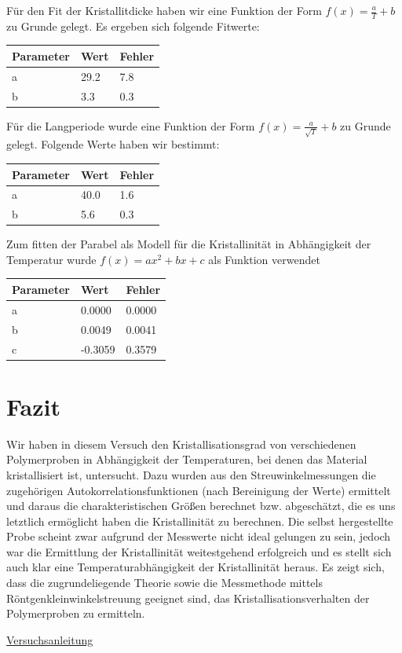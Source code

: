 \documentclass[bigchapter,colorback,accentcolor=tud4b,linedtoc,11pt]{tudreport}
\begin{document}
Für den Fit der Kristallitdicke haben wir eine Funktion der Form $f\left(x\right) = \frac{a}{T} + b$ zu Grunde gelegt. Es ergeben sich folgende Fitwerte:
\begin{center}
  \begin{tabular}{|p{1.5cm}|p{1.5cm}|p{1.5cm}|}
    \hline
    Parameter & Wert    & Fehler \\ \hline
    a         & 29.2   & 7.8   \\ \hline
    b         & 3.3    & 0.3   \\ \hline
	\end{tabular}
\end{center}

Für die Langperiode wurde eine Funktion der Form $f\left(x\right)  = \frac{a}{\sqrt{T}} + b$ zu Grunde gelegt. Folgende Werte haben wir bestimmt:
\begin{center}
  \begin{tabular}{|p{1.5cm}|p{1.5cm}|p{1.5cm}|}
    \hline
    Parameter & Wert    & Fehler \\ \hline
    a         & 40.0   & 1.6   \\ \hline
    b         & 5.6    & 0.3   \\ \hline
	\end{tabular}
\end{center}

Zum fitten der Parabel als Modell für die Kristallinität in Abhängigkeit der Temperatur wurde $f\left(x\right)  = ax^2 + bx + c$ als Funktion verwendet

\begin{center}
  \begin{tabular}{|p{1.5cm}|p{1.5cm}|p{1.5cm}|}
    \hline
    Parameter & Wert    & Fehler \\ \hline
    a         & 0.0000  & 0.0000 \\ \hline
    b         & 0.0049  & 0.0041 \\ \hline
    c         & -0.3059 & 0.3579 \\ \hline
	\end{tabular}
\end{center}

\chapter{Fazit}

Wir haben in diesem Versuch den Kristallisationsgrad von verschiedenen Polymerproben in Abhängigkeit der Temperaturen, bei denen das Material kristallisiert ist, untersucht. Dazu wurden aus den Streuwinkelmessungen die zugehörigen Autokorrelationsfunktionen (nach Bereinigung der Werte) ermittelt und daraus die charakteristischen Größen berechnet bzw. abgeschätzt, die es uns letztlich ermöglicht haben die Kristallinität zu berechnen. Die selbst hergestellte Probe scheint zwar aufgrund der Messwerte nicht ideal gelungen zu sein, jedoch war die Ermittlung der Kristallinität weitestgehend erfolgreich und es stellt sich auch klar eine Temperaturabhängigkeit der Kristallinität heraus. Es zeigt sich, dass die zugrundeliegende Theorie sowie die Messmethode mittels Röntgenkleinwinkelstreuung geeignet sind, das Kristallisationsverhalten der Polymerproben zu ermitteln.

\cleardoublepage{}
\newpage
\begin{thebibliography}{100}
   \url{Versuchsanleitung}
\end{thebibliography}
\end{document}
